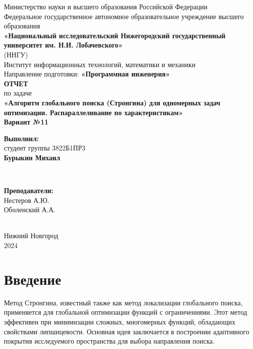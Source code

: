 \documentclass[a4paper,12pt]{article}
\begin{document}
\begin{titlepage}
    \centering
    \large
    Министерство науки и высшего образования Российской Федерации\\[0.5cm]
    Федеральное государственное автономное образовательное учреждение высшего образования\\[0.5cm]
    \textbf{«Национальный исследовательский Нижегородский государственный университет им. Н.И. Лобачевского»}\\
    (ННГУ)\\[1cm]
    Институт информационных технологий, математики и механики\\[0.5cm]
    Направление подготовки: \textbf{«Программная инженерия»}\\[2cm]

    \vfill %
    {\LARGE \textbf{ОТЧЕТ}}\\[0.5cm]
    {\Large по задаче}\\[0.5cm]
    {\LARGE \textbf{«Алгоритм глобального поиска (Стронгина) для одномерных задач оптимизации. 
Распараллеливание по характеристикам»}}\\[0.5cm]
    {\Large \textbf{Вариант №11}}\\[2.5cm]

    \hfill\parbox{0.5\textwidth}{
        \textbf{Выполнил:} \\
        студент группы 3822Б1ПР3 \\
        \textbf{Бурыкин Михаил}
    }\\[0.5cm]

    \hfill\parbox{0.5\textwidth}{
        \textbf{Преподаватели:} \\
        Нестеров А.Ю.\\
        Оболенский А.А.

    }\\[2cm]

    Нижний Новгород\\
    2024
\end{titlepage}

\tableofcontents
\newpage

\section{Введение}

\hspace*{1.25em}Метод Стронгина, известный также как метод локализации глобального поиска, применяется для глобальной оптимизации функций с ограничениями. Этот метод эффективен при минимизации сложных, многомерных функций, обладающих свойствами липшицевости. Основная идея заключается в построении адаптивного покрытия исследуемого пространства для выбора направления поиска.
\end{document}
